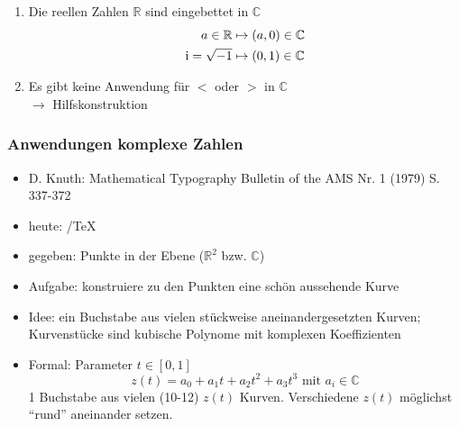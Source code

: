 \begin{note}\flush
  \begin{enumerate}
    \item Die reellen Zahlen $\mathbb{R}$ sind eingebettet in $\mathbb{C}$
      \begin{align*}
      a \in \mathbb{R} & \mapsto (a, 0) \in \mathbb{C}\\
      \operatorname{i} = \sqrt{-1} & \mapsto (0, 1)  \in \mathbb{C}
      \end{align*}
    \item Es gibt keine Anwendung für $<$ oder $>$ in $\mathbb{C}$\\ $\rightarrow$ Hilfskonstruktion
  \end{enumerate}
\end{note}

\subsubsection*{Anwendungen komplexe Zahlen}
\begin{itemize}
  \item D. Knuth: Mathematical Typography Bulletin of the AMS Nr. 1 (1979) S. 337-372
  \item heute: \MF/\TeX{}
  \item gegeben: Punkte in der Ebene ($\mathbb{R}^2$ bzw. $\mathbb{C}$)
  \item Aufgabe: konstruiere zu den Punkten eine schön aussehende Kurve
  \item Idee: ein Buchstabe aus vielen stückweise aneinandergesetzten Kurven; Kurvenstücke sind kubische Polynome mit komplexen Koeffizienten
  \item Formal: Parameter $ t \in [0,1] $ \\
    \begin{equation*}z(t) = a_0 + a_1 t + a_2 t^2 + a_3 t^3 \text{ mit }  a_i \in \mathbb{C}\end{equation*}
    1 Buchstabe aus vielen (10-12) $z(t)$ Kurven. Verschiedene $z(t)$ möglichst ``rund'' aneinander setzen.
\end{itemize}


